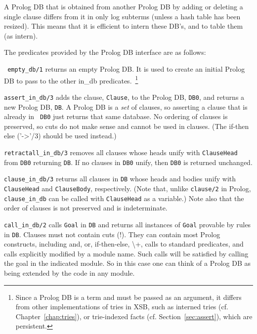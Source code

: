A Prolog DB that is obtained from another Prolog DB by adding or
deleting a single clause differs from it in only log subterms (unless
a hash table has been resized).  This means that it is efficient to
intern these DB's, and to table them (as intern).

The predicates provided by the Prolog DB interface are as follows:
\begin{description}
 {\tt
  empty\_db/1} returns an empty Prolog DB.  It is used to create an
initial Prolog DB to pass to the other in\_db
predicates.~\footnote{Since a Prolog DB is a term and must be passed
  as an argument, it differs from other implementations of tries in
  XSB, such as interned tries (cf. Chapter~\ref{chap:tries}), or
  trie-indexed facts (cf. Section~\ref{sec:assert}), which are
  persistent.}

{\tt assert\_in\_db/3} adds the clause, {\tt Clause}, to the Prolog
DB, {\tt DB0}, and returns a new Prolog DB, {\tt DB}.  A Prolog DB is
a {\em set} of clauses, so asserting a clause that is already in {\tt
DB0} just returns that same database.  No ordering of clauses is
preserved, so cuts do not make sense and cannot be used in clauses.
(The if-then else ('->'/3) should be used instead.)

{\tt retractall\_in\_db/3} removes all clauses whose heads unify with
{\tt ClauseHead} from {\tt DB0} returning {\tt DB}.  If no clauses in
{\tt DB0} unify, then {\tt DB0} is returned unchanged.

{\tt clause\_in\_db/3} returns all clauses in {\tt DB} whose heads and
bodies unify with {\tt ClauseHead} and {\tt ClauseBody}, respectively.
(Note that, unlike {\tt clause/2} in Prolog, {\tt clause\_in\_db} can
be called with {\tt ClauseHead} as a variable.)  Note also that the
order of clauses is not preserved and is indeterminate.

{\tt call\_in\_db/2} calls {\tt Goal} in {\tt DB} and returns all
instances of {\tt Goal} provable by rules in {\tt DB}.  Clauses must
not contain cuts (!).  They can contain most Prolog constructs,
including and, or, if-then-else, \textbackslash+, calls to standard predicates, and
calls explicitly modified by a module name. Such calls will be
satisfied by calling the goal in the indicated module. So in this case
one can think of a Prolog DB as being extended by the code in any
module.


\end{description}
